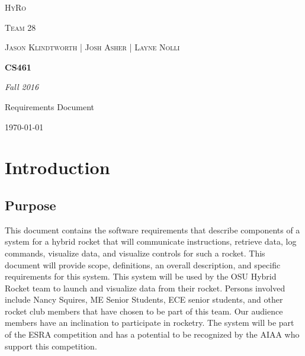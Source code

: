 \documentclass[10pt,draftclsnofoot,onecolumn,compsoc]{IEEEtran}
\begin{document}
\begin{titlepage}
	\centering
	{\scshape\LARGE HyRo \par}
	{\scshape\LARGE Team 28\par}
	\vspace{1cm}
	{\scshape\Large Jason Klindtworth  |  Josh Asher  |   Layne Nolli}
	\noindent\makebox[\linewidth]{\rule{17cm}{2pt}}
	\vspace{1cm}
	{\huge\bfseries CS461\par}
	\vspace{2cm}
	{\Large\itshape Fall 2016\par}
	\vspace{4cm}
	{\large Requirements Document\par}\vspace{8cm}
	\noindent\makebox[\linewidth]{\rule{17cm}{2pt}}
	\vfill

	{\large \today\par}
\end{titlepage}


\setcounter{tocdepth}{2}
\tableofcontents

\section{ Introduction}
\subsection{Purpose}
  This document contains the software requirements that describe components of a system for a hybrid rocket that will communicate instructions, retrieve data, log commands,
 visualize data, and visualize controls for such a rocket.  This document will provide scope, definitions, an overall description, and specific requirements for this system.
 This system will be used by the OSU Hybrid Rocket team to launch and visualize data from their rocket. Persons involved include Nancy Squires, ME Senior Students, ECE senior students,
 and other rocket club members that have chosen to be part of this team. Our audience members have an inclination to participate in rocketry. The system will be part of the ESRA
competition and has a potential to be recognized by the AIAA who support this competition.
\end{document}
